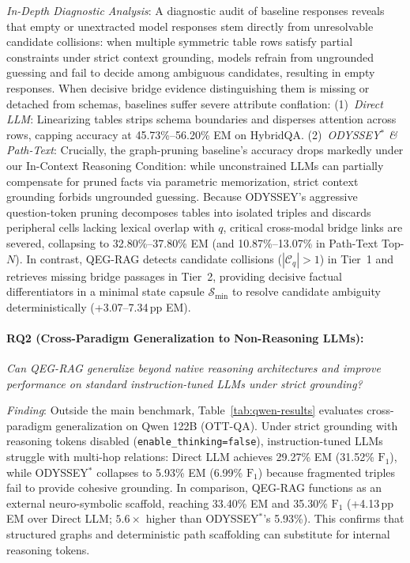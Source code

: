 \documentclass[runningheads]{llncs}
\begin{document}
\emph{In-Depth Diagnostic Analysis}: A diagnostic audit of baseline responses reveals that empty or unextracted model responses stem directly from unresolvable candidate collisions: when multiple symmetric table rows satisfy partial constraints under strict context grounding, models refrain from ungrounded guessing and fail to decide among ambiguous candidates, resulting in empty responses. When decisive bridge evidence distinguishing them is missing or detached from schemas, baselines suffer severe attribute conflation: (1)~\emph{Direct LLM}: Linearizing tables strips schema boundaries and disperses attention across rows, capping accuracy at 45.73\%--56.20\% EM on HybridQA. (2)~\emph{ODYSSEY$^*$ \& Path-Text}: Crucially, the graph-pruning baseline's accuracy drops markedly under our In-Context Reasoning Condition: while unconstrained LLMs can partially compensate for pruned facts via parametric memorization, strict context grounding forbids ungrounded guessing. Because ODYSSEY's aggressive question-token pruning decomposes tables into isolated triples and discards peripheral cells lacking lexical overlap with $q$, critical cross-modal bridge links are severed, collapsing to 32.80\%--37.80\% EM (and 10.87\%--13.07\% in Path-Text Top-$N$). In contrast, QEG-RAG detects candidate collisions ($|\mathcal{C}_q| > 1$) in Tier~1 and retrieves missing bridge passages in Tier~2, providing decisive factual differentiators in a minimal state capsule $\mathcal{S}_{\min}$ to resolve candidate ambiguity deterministically (+3.07--7.34\,pp EM).

\paragraph{RQ2 (Cross-Paradigm Generalization to Non-Reasoning LLMs):}
\emph{Can QEG-RAG generalize beyond native reasoning architectures and improve performance on standard instruction-tuned LLMs under strict grounding?}

\emph{Finding}: Outside the main benchmark, Table~\ref{tab:qwen-results} evaluates cross-paradigm generalization on Qwen 122B (OTT-QA). Under strict grounding with reasoning tokens disabled (\texttt{enable\_thinking=false}), instruction-tuned LLMs struggle with multi-hop relations: Direct LLM achieves 29.27\% EM (31.52\% $\text{F}_1$), while ODYSSEY$^*$ collapses to 5.93\% EM (6.99\% $\text{F}_1$) because fragmented triples fail to provide cohesive grounding. In comparison, QEG-RAG functions as an external neuro-symbolic scaffold, reaching 33.40\% EM and 35.30\% $\text{F}_1$ (+4.13\,pp EM over Direct LLM; $5.6\times$ higher than ODYSSEY$^*$'s 5.93\%). This confirms that structured graphs and deterministic path scaffolding can substitute for internal reasoning tokens.
\end{document}
